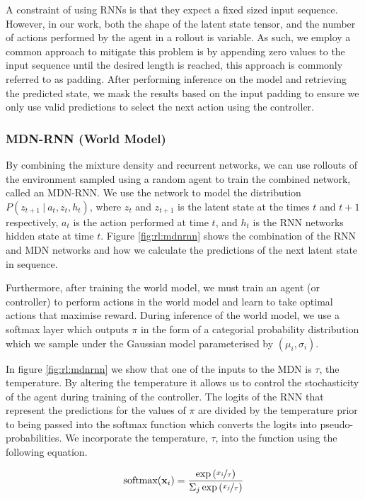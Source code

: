 A constraint of using RNNs is that they expect a fixed sized input sequence. However, in our work, both the shape of the latent state tensor, and the number of actions performed by the agent in a rollout is variable. As such, we employ a common approach to mitigate this problem is by appending zero values to the input sequence until the desired length is reached, this approach is commonly referred to as padding. After performing inference on the model and retrieving the predicted state, we mask the results based on the input padding to ensure we only use valid predictions to select the next action using the controller.

\subsubsection{MDN-RNN (World Model)}

By combining the mixture density and recurrent networks, we can use rollouts of the environment sampled using a random agent to train the combined network, called an MDN-RNN. We use the network to model the distribution $P(z_{t+1}~|~a_t, z_t, h_t)$, where $z_t$ and $z_{t+1}$ is the latent state at the times $t$ and $t+1$ respectively, $a_t$ is the action performed at time $t$, and $h_t$ is the RNN networks hidden state at time $t$. Figure \ref{fig:rl:mdnrnn} shows the combination of the RNN and MDN networks and how we calculate the predictions of the next latent state in sequence.

Furthermore, after training the world model, we must train an agent (or controller) to perform actions in the world model and learn to take optimal actions that maximise reward. During inference of the world model, we use a softmax layer which outputs $\pi$ in the form of a categorial probability distribution which we sample under the Gaussian model parameterised by $(\mu_i, \sigma_i)$.

In figure \ref{fig:rl:mdnrnn} we show that one of the inputs to the MDN is $\tau$, the temperature. By altering the temperature it allows us to control the stochasticity of the agent during training of the controller. The logits of the RNN that represent the predictions for the values of $\pi$ are divided by the temperature prior to being passed into the softmax function which converts the logits into pseudo-probabilities. We incorporate the temperature, $\tau$, into the function using the following equation.

$$
\text{softmax}(\mathbf{x}_i) = \frac{\exp\left( \nicefrac{x_i}{\tau} \right) }{\Sigma_j \exp \left( \nicefrac{x_j}{\tau} \right) }
$$

